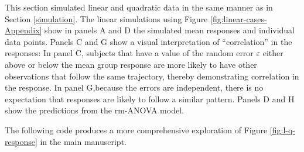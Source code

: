 \documentclass[
]{article}
\begin{document}
This section simulated linear and quadratic data in the same manner as in Section \ref{simulation}. The linear simulations using Figure \ref{fig:linear-cases-Appendix} show in panels A and D the simulated mean responses and individual data points. Panels C and G show a visual interpretation of ``correlation'' in the responses: In panel C, subjects that have a value of the random error \(\varepsilon\) either above or below the mean group response are more likely to have other observations that follow the same trajectory, thereby demonstrating correlation in the response. In panel G,because the errors are independent, there is no expectation that responses are likely to follow a similar pattern. Panels D and H show the predictions from the rm-ANOVA model.

The following code produces a more comprehensive exploration of Figure \ref{fig:l-q-response} in the main manuscript.
\end{document}
